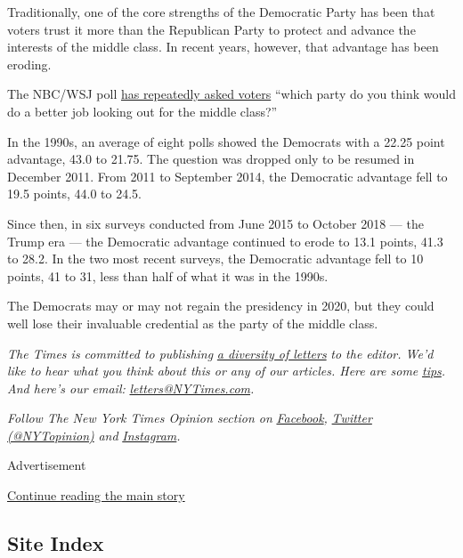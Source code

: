 Traditionally, one of the core strengths of the Democratic Party has
been that voters trust it more than the Republican Party to protect and
advance the interests of the middle class. In recent years, however,
that advantage has been eroding.

The NBC/WSJ poll
\href{http://wsj.com/public/resources/documents/181259NBCWSJOctober2018PollFinal.pdf?mod=article_inline\&mod=article_inline}{has
repeatedly asked voters} ``which party do you think would do a better
job looking out for the middle class?''

In the 1990s, an average of eight polls showed the Democrats with a
22.25 point advantage, 43.0 to 21.75. The question was dropped only to
be resumed in December 2011. From 2011 to September 2014, the Democratic
advantage fell to 19.5 points, 44.0 to 24.5.

Since then, in six surveys conducted from June 2015 to October 2018 ---
the Trump era --- the Democratic advantage continued to erode to 13.1
points, 41.3 to 28.2. In the two most recent surveys, the Democratic
advantage fell to 10 points, 41 to 31, less than half of what it was in
the 1990s.

The Democrats may or may not regain the presidency in 2020, but they
could well lose their invaluable credential as the party of the middle
class.

\emph{The Times is committed to publishing}
\href{https://www.nytimes3xbfgragh.onion/2019/01/31/opinion/letters/letters-to-editor-new-york-times-women.html}{\emph{a
diversity of letters}} \emph{to the editor. We'd like to hear what you
think about this or any of our articles. Here are some}
\href{https://help.nytimes3xbfgragh.onion/hc/en-us/articles/115014925288-How-to-submit-a-letter-to-the-editor}{\emph{tips}}\emph{.
And here's our email:}
\href{mailto:letters@NYTimes.com}{\emph{letters@NYTimes.com}}\emph{.}

\emph{Follow The New York Times Opinion section on}
\href{https://www.facebookcorewwwi.onion/nytopinion}{\emph{Facebook}}\emph{,}
\href{http://twitter.com/NYTOpinion}{\emph{Twitter (@NYTopinion)}}
\emph{and}
\href{https://www.instagram.com/nytopinion/}{\emph{Instagram}}\emph{.}

Advertisement

\protect\hyperlink{after-bottom}{Continue reading the main story}

\hypertarget{site-index}{%
\subsection{Site Index}\label{site-index}}

